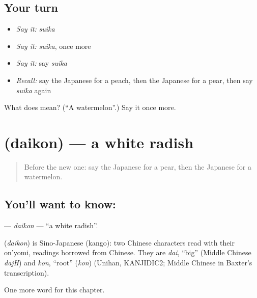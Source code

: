 \subsection*{Your turn}
\begin{itemize}
\raggedright
  \item \emph{Say it:} \emph{suika}
  \item \emph{Say it:} \emph{suika}, once more
  \item \emph{Say it:} say \emph{suika}
  \item \emph{Recall:} say the Japanese for a peach, then the Japanese for a pear, then say \emph{suika} again
\end{itemize}

\begin{tcolorbox}[breakable,colback=teal!4,colframe=teal!35!black,title={Before you move on}]
What does  mean? (\textquotedblleft{}A watermelon\textquotedblright{}.) Say it once more.
\end{tcolorbox}
\section[\texorpdfstring{\ja{だいこん} (daikon)}{だいこん (daikon)}]{ (daikon) — a white radish}

\label{lesson:JA-C34-daikon}



\begin{quote}
Before the new one: say the Japanese for a pear, then the Japanese for a watermelon.
\end{quote}

\subsection*{You'll want to know: }
\textbf{} — \emph{daikon} — \textquotedblleft{}a white radish\textquotedblright{}.

\begin{cousinweb}
\textbf{} (\emph{daikon}) is Sino-Japanese (kango): two Chinese characters read with their on'yomi, readings borrowed from Chinese. They are \emph{dai}, \textquotedblleft{}big\textquotedblright{} (Middle Chinese \emph{dajH}) and \emph{kon}, \textquotedblleft{}root\textquotedblright{} (\emph{kon}) (Unihan, KANJIDIC2; Middle Chinese in Baxter's transcription).
\end{cousinweb}

\begin{grammarlens}[title={What you've built}]
One more word for this chapter.
\end{grammarlens}

